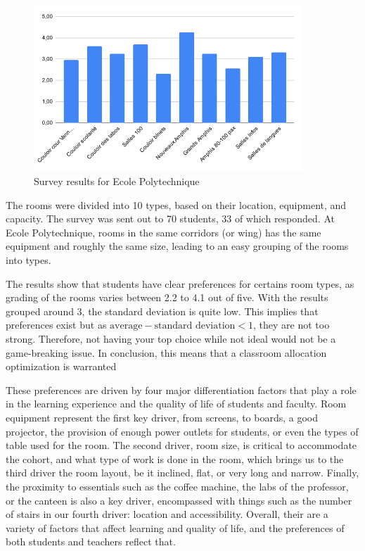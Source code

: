 \documentclass[a4paper, oneside]{article}
\theoremstyle{plain}
\begin{document}
\begin{minipage}{0.6\textwidth}
    \begin{figure}[H]
        \includegraphics[width=0.9\textwidth]{images/survey_result.png}
        \caption{Survey results for Ecole Polytechnique}
    \end{figure}
\end{minipage}
\begin{minipage}{0.4\textwidth}
    The rooms were divided into 10 types, based on their location, equipment, and capacity. The survey was sent out to 70 students, 33 of which responded. At Ecole Polytechnique,
    rooms in the same corridors (or wing) has the same equipment and roughly the same size, leading to an easy grouping of the rooms into types.

	The results show that students have clear preferences for certains room types, as grading of the rooms varies between 2.2 to 4.1 out of five. With the results grouped around 3, the standard deviation is quite low. 
	This implies that preferences exist but as $\text{average} - \text{standard deviation} < 1$, they are not too strong. Therefore, not having your top choice while not
	ideal would not be a game-breaking issue. In conclusion, this means that a classroom allocation optimization is warranted\\
\end{minipage}

These preferences are driven by four major differentiation factors that play a role in the learning experience and the quality of life of students and faculty. Room equipment represent the 
first key driver, from screens, to boards, a good projector, the provision of enough power outlets for students, or even the types of table used for the room. The second driver, room size, is critical 
to accommodate the cohort, and what type of work is done in the room, which brings us to the third driver the room layout, be it inclined, flat, or very long and narrow. Finally, the proximity to 
essentials such as the coffee machine, the labs of the professor, or the canteen is also a key driver, encompassed with things such as the number of stairs in our fourth driver: location and accessibility.
Overall, their are a variety of factors that affect learning and quality of life, and the preferences of both students and teachers reflect that. 
\end{document}
